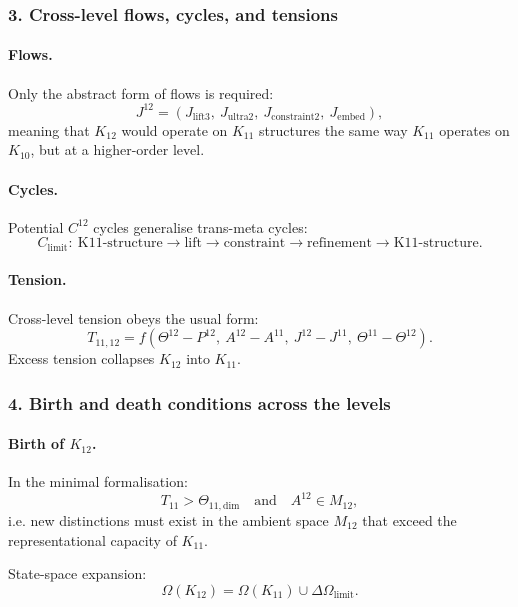 \subsubsection{3. Cross-level flows, cycles, and tensions}

\paragraph{Flows.}
Only the abstract form of flows is required:
\[
J^{12} = (J_{\mathrm{lift3}},\ J_{\mathrm{ultra2}},\
          J_{\mathrm{constraint2}},\ J_{\mathrm{embed}}),
\]
meaning that $K_{12}$ would operate on $K_{11}$ structures the same way
$K_{11}$ operates on $K_{10}$, but at a higher-order level.

\paragraph{Cycles.}
Potential $C^{12}$ cycles generalise trans-meta cycles:
\[
C_{\mathrm{limit}}:\ 
\text{K11-structure} \rightarrow \text{lift} \rightarrow
\text{constraint} \rightarrow \text{refinement} \rightarrow \text{K11-structure}.
\]

\paragraph{Tension.}
Cross-level tension obeys the usual form:
\[
T_{11,12} =
f(\Theta^{12} - P^{12},\ A^{12} - A^{11},\
  J^{12} - J^{11},\ \Theta^{11} - \Theta^{12}).
\]
Excess tension collapses $K_{12}$ into $K_{11}$.

\subsubsection{4. Birth and death conditions across the levels}

\paragraph{Birth of $K_{12}$.}
In the minimal formalisation:
\[
T_{11} > \Theta_{11,\mathrm{dim}}
\quad\text{and}\quad
A^{12} \in M_{12},
\]
i.e. new distinctions must exist in the ambient space $M_{12}$ that exceed
the representational capacity of $K_{11}$.

State-space expansion:
\[
\Omega(K_{12}) = \Omega(K_{11}) \cup \Delta\Omega_{\mathrm{limit}}.
\]


